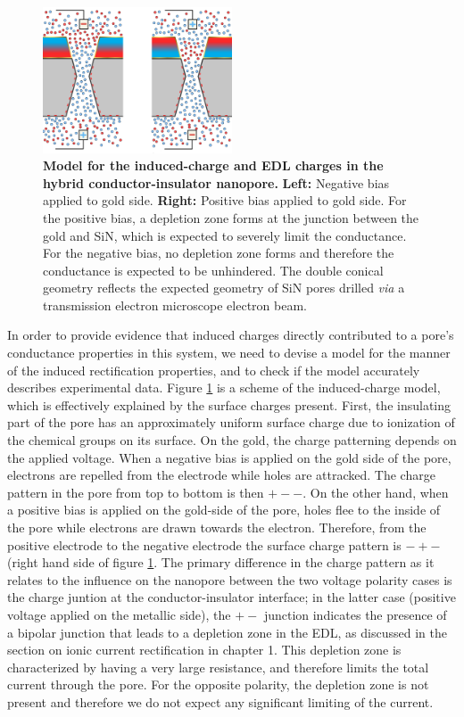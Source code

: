 		\begin{figure}
			\includegraphics[width=0.5\textwidth]{SiN-Gold_Model.png}
			\caption{\textbf{Model for the induced-charge and EDL charges in the hybrid conductor-insulator nanopore.} \textbf{Left:} Negative bias applied to gold side. \textbf{Right:} Positive bias applied to gold side. For the positive bias, a depletion zone forms at the junction between the gold and SiN, which is expected to severely limit the conductance. For the negative bias, no depletion zone forms and therefore the conductance is expected to be unhindered. The double conical geometry reflects the expected geometry of SiN pores drilled \textit{via} a transmission electron microscope electron beam.}
			\label{fig:SiNGoldModel}
		\end{figure}

		
		In order to provide evidence that induced charges directly contributed to a pore's conductance properties in this system, we need to devise a model for the manner of the induced rectification properties, and to check if the model accurately describes experimental data. Figure \ref{fig:SiNGoldModel} is a scheme of the induced-charge model, which is effectively explained by the surface charges present. First, the insulating part of the pore has an approximately uniform surface charge due to ionization of the chemical groups on its surface. On the gold, the charge patterning depends on the applied voltage. When a negative bias is applied on the gold side of the pore, electrons are repelled from the electrode while holes are attracked. The charge pattern in the pore from top to bottom is then $+--$. On the other hand, when a positive bias is applied on the gold-side of the pore, holes flee to the inside of the pore while electrons are drawn towards the electron. Therefore, from the positive electrode to the negative electrode the surface charge pattern is $-+-$ (right hand side of figure \ref{fig:SiNGoldModel}. The primary difference in the charge pattern as it relates to the influence on the nanopore between the two voltage polarity cases is the charge juntion at the conductor-insulator interface; in the latter case (positive voltage applied on the metallic side), the $+-$ junction indicates the presence of a bipolar junction that leads to a depletion zone in the EDL, as discussed in the section on ionic current rectification in chapter 1. This depletion zone is characterized by having a very large resistance, and therefore limits the total current through the pore. For the opposite polarity, the depletion zone is not present and therefore we do not expect any significant limiting of the current.
		
